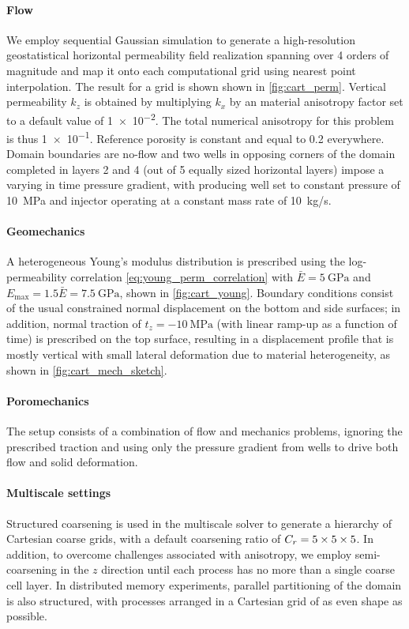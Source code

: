\paragraph{Flow}
We employ sequential Gaussian simulation to generate a high-resolution geostatistical horizontal permeability field realization spanning over 4 orders of magnitude and map it onto each computational grid using nearest point interpolation. The result for a  grid is shown shown in \cref{fig:cart_perm}.   Vertical permeability $k_z$ is obtained by multiplying $k_x$ by an material anisotropy factor set to a default value of \num{1e-2}.   The total numerical anisotropy for this problem is thus \num{1e-1}.    Reference porosity is constant and equal to 0.2 everywhere.   Domain boundaries are no-flow and two wells in opposing corners of the domain completed in layers 2 and 4 (out of 5 equally sized horizontal layers)  impose a varying in time pressure gradient, with producing well set to constant pressure of \qty{10}{\MPa} and injector operating at a constant mass rate of \qty{10}{kg/s}.

\paragraph{Geomechanics}
A heterogeneous Young's modulus distribution is prescribed using the log-permeability correlation \cref{eq:young_perm_correlation} with $\bar{E} = \qty{5}{\GPa}$ and $E_{\max} = 1.5 \bar{E} = \qty{7.5}{\GPa}$, shown in \cref{fig:cart_young}.   Boundary conditions consist of the usual constrained normal displacement on the bottom and side surfaces; in addition, normal traction of $t_z = -\qty{10}{\MPa}$ (with linear ramp-up as a function of time) is prescribed on the top surface, resulting in a displacement profile that is mostly vertical with small lateral deformation due to material heterogeneity, as shown in \cref{fig:cart_mech_sketch}.

\paragraph{Poromechanics}
The setup consists of a combination of flow and mechanics problems, ignoring the prescribed traction and using only the pressure gradient from wells to drive both flow and solid deformation.

\paragraph{Multiscale settings}
Structured coarsening is used in the multiscale solver to generate a hierarchy of Cartesian coarse grids, with a default coarsening ratio of $C_r = \numproduct{5x5x5}$.   In addition, to overcome challenges associated with anisotropy, we employ semi-coarsening in the $z$ direction until each process has no more than a single coarse cell layer.   In distributed memory experiments, parallel partitioning of the domain is also structured, with processes arranged in a Cartesian grid of as even shape as possible.

